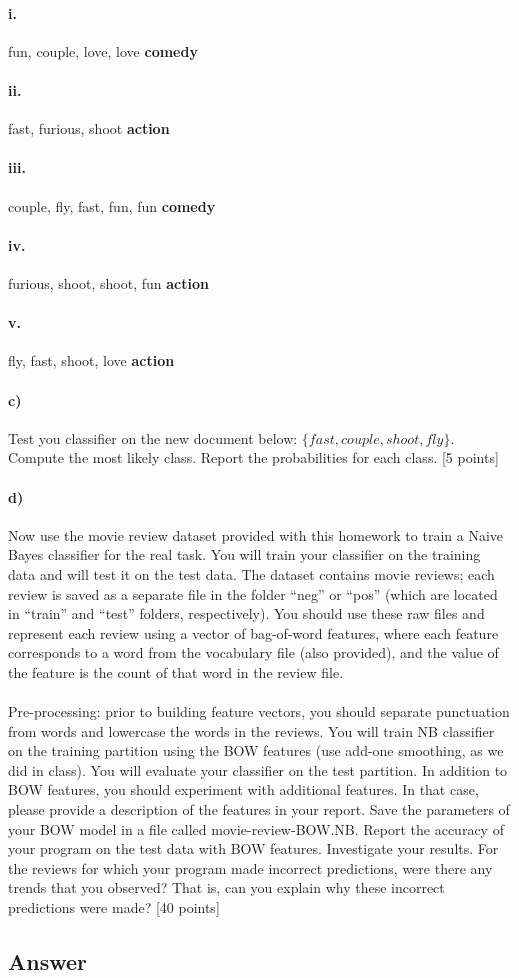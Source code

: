 \documentclass{article}
\begin{document}
\paragraph{i.} fun, couple, love, love \textbf{comedy}
\paragraph{ii.} fast, furious, shoot \textbf{action}
\paragraph{iii.} couple, fly, fast, fun, fun \textbf{comedy}
\paragraph{iv.} furious, shoot, shoot, fun \textbf{action}
\paragraph{v.} fly, fast, shoot, love \textbf{action}

\paragraph{c)} Test you classifier on the new document below: $\{fast,couple,shoot,fly\}$. Compute the most likely class. Report the probabilities for each class. [5 points]

\paragraph{d)} Now use the movie review dataset provided with this homework to train a Naive Bayes classifier for the real task. You will train your classifier on the training data and will test it on the test data. The dataset contains movie reviews; each review is saved as a separate file in the folder “neg” or “pos” (which are located in “train” and “test” folders, respectively). You should use these raw files and represent each review using a vector of bag-of-word features, where each feature corresponds to a word from the vocabulary file (also provided), and the value of the feature is the count of that word in the review file.

\paragraph{} Pre-processing: prior to building feature vectors, you should separate punctuation from words and lowercase the words in the reviews. You will train NB classifier on the training partition using the BOW features (use add-one smoothing, as we did in class). You will evaluate your classifier on the test partition. In addition to BOW features, you should experiment with additional features. In that case, please provide a description of the features in your report. Save the parameters of your BOW model in a file called movie-review-BOW.NB. Report the accuracy of your program on the test data with BOW features.
Investigate your results. For the reviews for which your program made incorrect predictions, were there any trends that you observed? That is, can you explain why these incorrect predictions were made? [40 points]

\subsection*{Answer}
\end{document}
